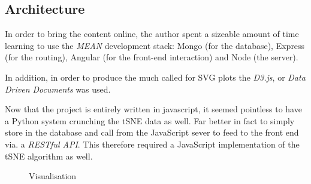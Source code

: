 \documentclass[a4paper,11pt,titlepage]{article}
\begin{document}
	\begin{figure}[H]
    			\centering	
    			\qquad
    			\caption{ }%
    			\label{fig:iter2}
	\end{figure}		
		
	\subsection{Architecture}
		In order to bring the content online, the author spent a sizeable amount of time learning to use the \textit{MEAN} development stack: Mongo (for the database), Express (for the routing), Angular (for the front-end interaction) and Node (the server). 
	\par 
	In addition, in order to produce the much called for SVG plots the \textit{D3.js}, or \textit{Data Driven Documents} was used. 
	\par 
	Now that the project is entirely written in javascript, it seemed pointless to have a Python system crunching the tSNE data as well. Far better in fact to simply store in the database and call from the JavaScript sever to feed to the front end via. a \textit{RESTful API}. This therefore required a JavaScript implementation of the tSNE algorithm as well. 

	\begin{figure}[H]
    			\caption{Visualisation}%
	\end{figure}
	
\end{document}
